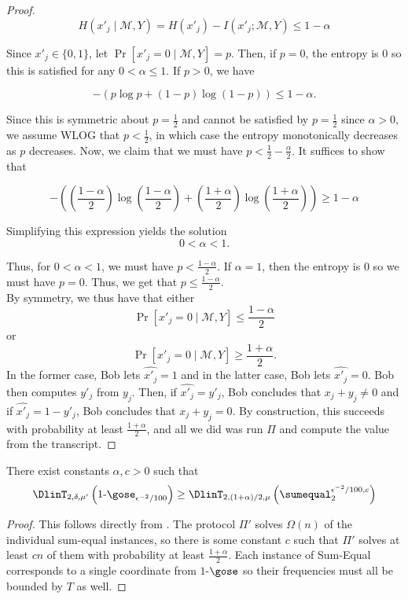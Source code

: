 \begin{proof}
$$H(x'_j \mid \mathcal{M},Y) = H(x'_j) - I(x'_j; \mathcal{M},Y) \le 1-\alpha$$

Since $x'_j \in \{0,1\}$, let $\Pr[x'_j = 0 \mid \mathcal{M},Y] = p$. Then, if $p=0$, the entropy is $0$ so this is satisfied for any $0 < \alpha \le 1$. If $p>0$, we have

$$-(p \log p + (1-p) \log (1-p))\le 1-\alpha.$$

Since this is symmetric about $p=\frac{1}{2}$ and cannot be satisfied by $p = \frac{1}{2}$ since $\alpha > 0$, we assume WLOG that $p < \frac{1}{2}$, in which case the entropy monotonically decreases as $p$ decreases. Now, we claim that we must have $p < \frac{1}{2}-\frac{\alpha}{2}$. It suffices to show that

$$ -\left(\left(\frac{1-\alpha}{2}\right) \log \left(\frac{1-\alpha}{2}\right) + \left(\frac{1+\alpha}{2}\right) \log \left(\frac{1+\alpha}{2}\right)\right) \ge 1-\alpha$$

Simplifying this expression yields the solution
$$0 < \alpha < 1.$$

Thus, for $0 < \alpha < 1$, we must have $p < \frac{1-\alpha}{2}$. If $\alpha=1$, then the entropy is $0$ so we must have $p=0$. Thus, we get that $p \le \frac{1-\alpha}{2}$.\\

By symmetry, we thus have that either
$$\Pr[x'_j = 0 \mid \mathcal{M},Y] \le \frac{1-\alpha}{2}$$
or
$$\Pr[x'_j = 0 \mid \mathcal{M},Y] \ge \frac{1+\alpha}{2}.$$
In the former case, Bob lets $\hat{x'_j} = 1$ and in the latter case, Bob lets $\hat{x'_j} = 0$. Bob then computes $y'_j$ from $y_j$. Then, if $\hat{x'_j} = y'_j$, Bob concludes that $x_j + y_j \ne 0$ and if $\hat{x'_j} = 1-y'_j$, Bob concludes that $x_j + y_j = 0$. By construction, this succeeds with probability at least $\frac{1+\alpha}{2}$, and all we did was run $\Pi$ and compute the value from the transcript.
\end{proof}


\begin{corollary}
{\color{black}There exist constants $\alpha,c > 0$ such that}
$$\DlinT_{2,\delta,\mu'}\left(1\text{-}\gose_{\epsilon^{-2}/100}\right) \ge \DlinT_{2,(1+\alpha)/2,\mu}\left(\sumequal^{\epsilon^{-2}/100,c}_2\right)$$
\end{corollary}

\begin{proof}
This follows directly from . The protocol $\Pi'$ solves $\Omega(n)$ of the individual sum-equal instances, so there is some constant $c$ such that $\Pi'$ solves at least $cn$ of them with probability at least $\frac{1+\alpha}{2}$. Each instance of Sum-Equal corresponds to a single coordinate from $1$-$\gose$ so their frequencies must all be bounded by $T$ as well.
\end{proof}

